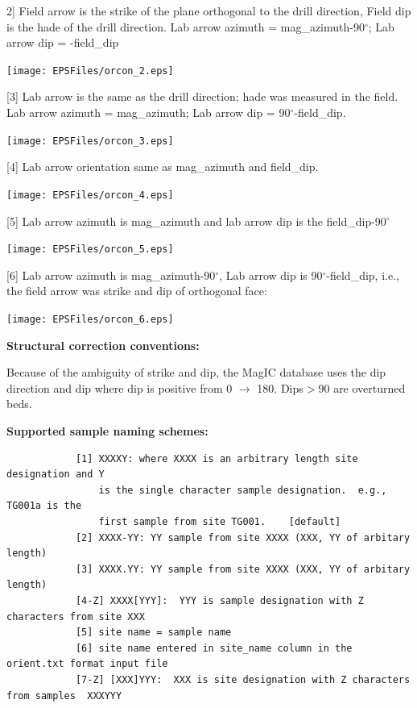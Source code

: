 \documentclass[11pt]{book}
\begin{document}
{{{  2] Field arrow is the strike of the plane orthogonal to the drill direction, Field dip is the hade of the drill direction. Lab arrow azimuth = mag\_azimuth-90$^{\circ}$; Lab arrow dip = -field\_dip

    \texttt{[image: EPSFiles/orcon\_2.eps]}

  [3] Lab arrow is the same as the drill direction; hade was measured in the field. Lab arrow azimuth = mag\_azimuth; Lab arrow dip = 90$^{\circ}$-field\_dip.

      \texttt{[image: EPSFiles/orcon\_3.eps]}

  [4] Lab arrow orientation same as mag\_azimuth and field\_dip.

        \texttt{[image: EPSFiles/orcon\_4.eps]}

        [5]  Lab arrow azimuth is  mag\_azimuth and lab arrow dip is the  field\_dip-90$^{\circ}$

               \texttt{[image: EPSFiles/orcon\_5.eps]}


 [6] Lab arrow azimuth is mag\_azimuth-90$^{\circ}$, Lab arrow dip is 90$^{\circ}$-field\_dip, i.e., the field arrow was strike and dip of orthogonal face:

                \texttt{[image: EPSFiles/orcon\_6.eps]}
                }

{\bf Structural correction conventions:}


Because of the ambiguity of strike and dip, the MagIC database uses the dip direction and dip where dip is positive from 0 $\rightarrow$ 180. Dips$ > $90 are overturned beds.



{\bf Supported sample naming schemes:}

\begin{verbatim}
            [1] XXXXY: where XXXX is an arbitrary length site designation and Y
                is the single character sample designation.  e.g., TG001a is the
                first sample from site TG001.    [default]
            [2] XXXX-YY: YY sample from site XXXX (XXX, YY of arbitary length)
            [3] XXXX.YY: YY sample from site XXXX (XXX, YY of arbitary length)
            [4-Z] XXXX[YYY]:  YYY is sample designation with Z characters from site XXX
            [5] site name = sample name
            [6] site name entered in site_name column in the orient.txt format input file
            [7-Z] [XXX]YYY:  XXX is site designation with Z characters from samples  XXXYYY
\end{verbatim}

}}
\end{document}

